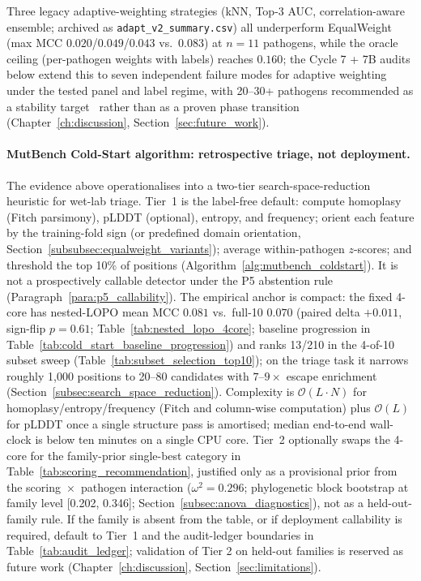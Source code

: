 Three legacy adaptive-weighting strategies (kNN, Top-3 AUC, correlation-aware ensemble; archived as \texttt{adapt\_v2\_summary.csv}) all underperform EqualWeight (max MCC $0.020$/$0.049$/$0.043$ vs.\ $0.083$) at $n=11$ pathogens, while the oracle ceiling (per-pathogen weights with labels) reaches $0.160$; the Cycle 7 + 7B audits below extend this to seven independent failure modes for adaptive weighting under the tested panel and label regime, with 20--30+ pathogens recommended as a stability target~\cite{bolker2009glmm} rather than as a proven phase transition (Chapter~\ref{ch:discussion}, Section~\ref{sec:future_work}).\label{subsec:adaptive_weighting_limits}

\paragraph{MutBench Cold-Start algorithm: retrospective triage, not deployment.}
\label{para:mutbench_algorithm}
The evidence above operationalises into a two-tier search-space-reduction heuristic for wet-lab triage. Tier~1 is the label-free default: compute homoplasy (Fitch parsimony), pLDDT (optional), entropy, and frequency; orient each feature by the training-fold sign (or predefined domain orientation, Section~\ref{subsubsec:equalweight_variants}); average within-pathogen $z$-scores; and threshold the top 10\% of positions (Algorithm~\ref{alg:mutbench_coldstart}). It is not a prospectively callable detector under the P5 abstention rule (Paragraph~\ref{para:p5_callability}). The empirical anchor is compact: the fixed 4-core has nested-LOPO mean MCC $0.081$ vs.\ full-10 $0.070$ (paired delta $+0.011$, sign-flip $p=0.61$; Table~\ref{tab:nested_lopo_4core}; baseline progression in Table~\ref{tab:cold_start_baseline_progression}) and ranks 13/210 in the 4-of-10 subset sweep (Table~\ref{tab:subset_selection_top10}); on the triage task it narrows roughly 1{,}000 positions to 20--80 candidates with $7$--$9\times$ escape enrichment (Section~\ref{subsec:search_space_reduction}). Complexity is $\mathcal{O}(L \cdot N)$ for homoplasy/entropy/frequency (Fitch and column-wise computation) plus $\mathcal{O}(L)$ for pLDDT once a single structure pass is amortised; median end-to-end wall-clock is below ten minutes on a single CPU core. Tier~2 optionally swaps the 4-core for the family-prior single-best category in Table~\ref{tab:scoring_recommendation}, justified only as a provisional prior from the scoring~$\times$~pathogen interaction ($\omega^2=0.296$; phylogenetic block bootstrap at family level [0.202, 0.346]; Section~\ref{subsec:anova_diagnostics}), not as a held-out-family rule. If the family is absent from the table, or if deployment callability is required, default to Tier~1 and the audit-ledger boundaries in Table~\ref{tab:audit_ledger}; validation of Tier 2 on held-out families is reserved as future work (Chapter~\ref{ch:discussion}, Section~\ref{sec:limitations}).

